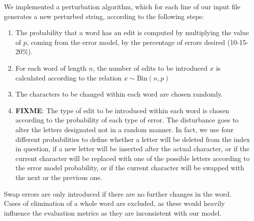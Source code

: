 We implemented a perturbation algorithm, which for each line of our input file generates a new perturbed 
string, according to the following steps:

\begin{enumerate}
	\item The probability that a word has an edit is computed by multiplying the value of $p$, coming from the 
	error model, by the percentage of errors desired (10-15-20\%).
	\item For each word of length $n$, the number of edits to be introduced $x$ is calculated according to the 
	relation $x \sim \text{Bin}(n, p)$
	\item The characters to be changed within each word are chosen randomly.
	\item \textbf{FIXME}: The type of edit to be introduced within each word is chosen according to the 
	probability of each type of error. 
	The disturbance goes to alter the letters designated not in a random manner. 
	In fact, we use four different probabilities to define whether a letter will be deleted from the index in question, 
	if a new letter will be inserted after the actual character, or if the current character will be replaced with one of 
	the possible letters according to the error model probability, or if the current character will be swapped with 
	the next or the previous one.
	
\end{enumerate}

Swap errors are only introduced if there are no further changes in the word. Cases of elimination of a whole 
word are excluded, as these would heavily influence the evaluation metrics as they are inconsistent with our 
model. 



